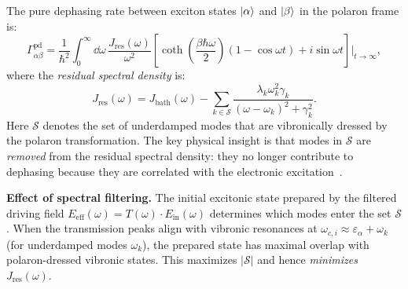 \documentclass[11pt,a4paper]{article}
\begin{document}
The pure dephasing rate between exciton states $\ket{\alpha}$ and $\ket{\beta}$ in the polaron frame is:
\begin{equation}
\Gamma_{\alpha\beta}^{\mathrm{pd}} = \frac{1}{\hbar^2} \int_0^\infty \dd{\omega}\, \frac{J_{\mathrm{res}}(\omega)}{\omega^2} \left[\coth\!\left(\frac{\beta\hbar\omega}{2}\right)(1 - \cos\omega t) + i\sin\omega t\right]\bigg|_{t\to\infty},
\label{eq:SI_dephasing_rate}
\end{equation}
where the \textit{residual spectral density} is:
\begin{equation}
\boxed{J_{\mathrm{res}}(\omega) = J_{\mathrm{bath}}(\omega) - \sum_{k \in \mathcal{S}} \frac{\lambda_k \omega_k^2 \gamma_k}{(\omega - \omega_k)^2 + \gamma_k^2}.}
\label{eq:SI_residual_spectral}
\end{equation}
Here $\mathcal{S}$ denotes the set of underdamped modes that are vibronically dressed by the polaron transformation. The key physical insight is that modes in $\mathcal{S}$ are \textit{removed} from the residual spectral density: they no longer contribute to dephasing because they are correlated with the electronic excitation~\cite{Chin2011,Chin2013}.

\textbf{Effect of spectral filtering.} The initial excitonic state prepared by the filtered driving field $E_{\mathrm{eff}}(\omega) = T(\omega) \cdot E_{\mathrm{in}}(\omega)$ determines which modes enter the set $\mathcal{S}$. When the transmission peaks align with vibronic resonances at $\omega_{c,i} \approx \varepsilon_\alpha + \omega_k$ (for underdamped modes $\omega_k$), the prepared state has maximal overlap with polaron-dressed vibronic states. This maximizes $|\mathcal{S}|$ and hence \textit{minimizes} $J_{\mathrm{res}}(\omega)$.
\end{document}
